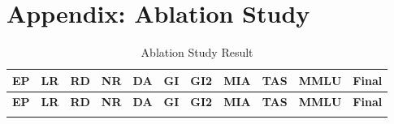 \documentclass[11pt]{article}
\begin{document}



\appendix

\section{Appendix: Ablation Study}
\label{sec:appendixA}

\onecolumn
\begin{longtable}[h]{|r|r|l|l|l|l|l|r|r|l|r|}
\caption{Ablation Study Result} \label{tab:longtable} \\

\hline
\multicolumn{1}{|c|}{\textbf{EP}} & \multicolumn{1}{c|}{\textbf{LR}} & \multicolumn{1}{c|}{\textbf{RD}} & \multicolumn{1}{c|}{\textbf{NR}} & \multicolumn{1}{c|}{\textbf{DA}} & \multicolumn{1}{c|}{\textbf{GI}} & \multicolumn{1}{c|}{\textbf{GI2}} & \multicolumn{1}{c|}{\textbf{MIA}} & \multicolumn{1}{c|}{\textbf{TAS}} & \multicolumn{1}{c|}{\textbf{MMLU}} & \multicolumn{1}{c|}{\textbf{Final}} \\ 
\hline
\endfirsthead

\hline
\multicolumn{1}{|c|}{\textbf{EP}} & \multicolumn{1}{c|}{\textbf{LR}} & \multicolumn{1}{c|}{\textbf{RD}} & \multicolumn{1}{c|}{\textbf{NR}} & \multicolumn{1}{c|}{\textbf{DA}} & \multicolumn{1}{c|}{\textbf{GI}} & \multicolumn{1}{c|}{\textbf{GI2}} & \multicolumn{1}{c|}{\textbf{MIA}} & \multicolumn{1}{c|}{\textbf{TAS}} & \multicolumn{1}{c|}{\textbf{MMLU}} & \multicolumn{1}{c|}{\textbf{Final}} \\
\hline
\endhead

\hline
\endfoot


\end{longtable}
\end{document}
